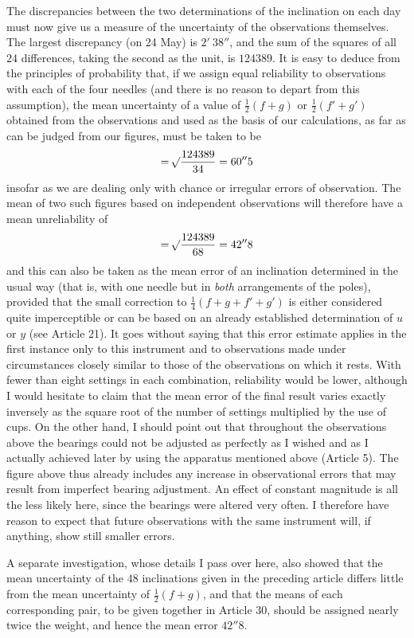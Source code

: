 The discrepancies between the two determinations of the inclination on each day must now give us a measure of the uncertainty of the observations themselves. The largest discrepancy (on 24 May) is $2'\ 38''$, and the sum of the squares of all $24$ differences, taking the second as the unit, is $124389$. It is easy to deduce from the principles of probability that, if we assign equal reliability to observations with each of the four needles (and there is no reason to depart from this assumption), the mean uncertainty of a value of $\tfrac12(f+g)$ or $\tfrac12(f'+g')$ obtained from the observations and used as the basis of our calculations, as far as can be judged from our figures, must be taken to be
\[
=\mathord{{}^{}\!\surd}\frac{124389}{34}=60''5
\]
insofar as we are dealing only with chance or irregular errors of observation. The mean of two such figures based on independent observations will therefore have a mean unreliability of
\[
=\mathord{{}^{}\!\surd}\frac{124389}{68}=42''8
\]
and this can also be taken as the mean error of an inclination determined in the usual way (that is, with one needle but in \textit{both} arrangements of the poles), provided that the small correction to $\tfrac14(f+g+f'+g')$ is either considered quite imperceptible or can be based on an already established determination of $u$ or $y$ (see Article 21). It goes without saying that this error estimate applies in the first instance only to this instrument and to observations made under circumstances closely similar to those of the observations on which it rests. With fewer than eight settings in each combination, reliability would be lower, although I would hesitate to claim that the mean error of the final result varies exactly inversely as the square root of the number of settings multiplied by the use of cups. On the other hand, I should point out that throughout the observations above the bearings could not be adjusted as perfectly as I wished and as I actually achieved later by using the apparatus mentioned above (Article 5). The figure above thus already includes any increase in observational errors that may result from imperfect bearing adjustment. An effect of constant magnitude is all the less likely here, since the bearings were altered very often. I therefore have reason to expect that future observations with the same instrument will, if anything, show still smaller errors.

A separate investigation, whose details I pass over here, also showed that the mean uncertainty of the $48$ inclinations given in the preceding article differs little from the mean uncertainty of $\tfrac12(f+g)$, and that the means of each corresponding pair, to be given together in Article 30, should be assigned nearly twice the weight, and hence the mean error $42''8$.

